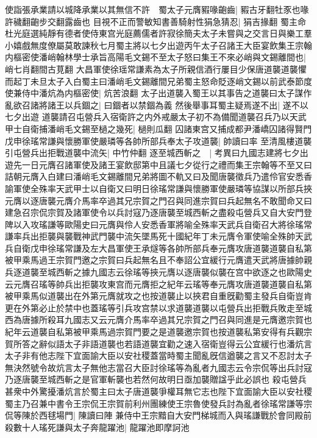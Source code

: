 使詣張承業請以城降承業以其無信不許　蜀太子元膺豭喙齙齒|{
	豭古牙翻牡豕也喙許穢翻齙步交翻露齒也}
目視不正而警敏知書善騎射性狷急猜忍|{
	狷吉掾翻}
蜀主命杜光庭選純靜有德者使侍東宫光庭薦儒者許寂徐簡夫太子未嘗與之交言日與樂工羣小嬉戲無度僚屬莫敢諫秋七月蜀主將以七夕出遊丙午太子召諸王大臣宴飲集王宗翰内樞密使潘峭翰林學士承旨高陽毛文錫不至太子怒曰集王不來必峭與文錫離間也|{
	峭七肖翻間古莧翻}
大昌軍使徐瑶常謙素為太子所親信酒行屢目少保唐道襲道襲懼而起丁未旦太子入白蜀主曰潘峭毛文錫離間兄弟蜀主怒命貶逐峭文錫以前武泰節度使兼侍中潘炕為内樞密使|{
	炕苦浪翻}
太子出道襲入蜀王以其事告之道襲曰太子謀作亂欲召諸將諸王以兵錮之|{
	曰錮者以禁錮為義}
然後舉事耳蜀主疑焉遂不出|{
	遂不以七夕出遊}
道襲請召屯營兵入宿衛許之内外戒嚴太子初不為備聞道襲召兵乃以天武甲士自衛捕潘峭毛文錫至檛之幾死|{
	檛則瓜翻}
囚諸東宫又捕成都尹潘嶠囚諸得賢門戊申徐瑤常謙與懷勝軍使嚴璘等各帥所部兵奉太子攻道襲|{
	帥讀曰率}
至清風樓道襲引屯營兵出拒戰道襲中流矢|{
	中竹仲翻}
逐至城西斬之　|{
	考異曰九國志建將七夕出遊先一日元膺召諸軍使及諸王宴飲邸第中且議七夕從行之禮而集王宗翰等不至又曰詰朝元膺入白建曰潘峭毛文錫離間兄弟將圖不軌又曰及聞唐襲徵兵乃遣伶官安悉香諭軍使全殊率天武甲士以自衛又曰明日徐瑤常謙與懷勝軍使嚴璘等協謀以所部兵挾元膺以逐唐襲元膺介馬率卒過其兄宗賀之門召與同進宗賀曰兵起無名不敢聞命又曰建急召宗侃宗賀及諸軍使令以兵討寇乃逐唐襲至城西斬之盡殺屯營兵又自大安門登陴以入攻瑤謙等歐陽史曰元膺與伶人安悉香軍將喻全殊率天武兵自衛召大將徐瑤常謙率兵出拒襲與襲戰神武門襲中流矢墜馬死十國紀年丁未元膺令軍使喻全殊帥天武兵自衛戊申徐瑤常謙及左大昌軍使王承燧等各帥所部兵奉元膺攻唐道襲道襲自私第被甲乘馬過王宗賀門邀之宗賀曰兵起無名且不奉詔公宜緩行元膺遣天武將唐據帥親兵逐道襲至城西斬之據九國志云徐瑤等挾元膺以逐唐襲似襲在宫中欲逐之也歐陽史云元膺召瑤等帥兵出拒襲攻東宫而元膺拒之紀年云瑤等奉元膺攻唐道襲道襲自私第被甲乘馬似道襲出在外第元膺就攻之也按道襲止以挾君自重旣勸蜀主發兵自衛豈肯更在外第必止於禁中也蓋瑤等引兵攻宫禁以求道襲道襲以屯營兵出拒戰兵敗走至城西為唐據所殺耳九國志又云元膺介馬率卒過其兄宗賀之門召與同進是元膺邀宗賀也紀年云道襲自私第被甲乘馬過宗賀門要之是道襲邀宗賀也按道襲私第安得有兵觀宗賀所答之辭似語太子非語道襲也若語道襲宜勸之速入宿衛豈得云公宜緩行也潘炕言太子非有他志陛下宜面諭大臣以安社稷蓋當時蜀主聞亂旣信遒襲之言又不忍討太子無決然號令故炕言太子無他志當召大臣討徐瑤等為亂者九國志云令宗侃等出兵討寇乃逐唐襲至城西斬之是官軍斬襲也若然何故明日亟加襲贈諡乎此必誤也}
殺屯營兵甚衆中外驚擾潘炕言於蜀主曰太子唐道襲爭權耳無它志也陛下宜面諭大臣以安社稷蜀主乃召兼中書令王宗侃王宗賀前利州團練使王宗魯使發兵討為亂者徐瑤常謙等宗侃等陳於西毬場門|{
	陳讀曰陣}
兼侍中王宗黯自大安門梯城而入與瑤謙戰於會同殿前殺數十人瑤死謙與太子奔龍躍池|{
	龍躍池即摩訶池}
